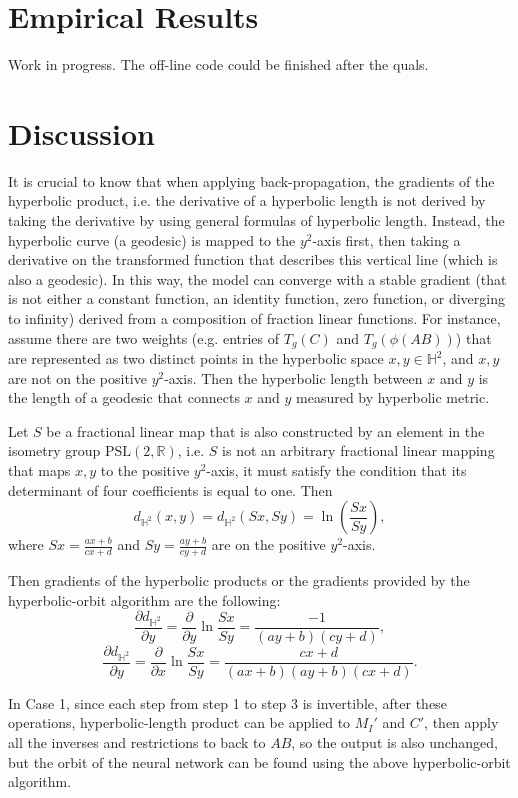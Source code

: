 \documentclass{article}
\theoremstyle{plain}
\theoremstyle{plain} %
\theoremstyle{definition}  %
\theoremstyle{remark}  %
\theoremstyle{plain}
\begin{document}
\section{Empirical Results}
Work in progress. The off-line code could be finished after the quals.

\section{Discussion}


It is crucial to know that when applying back-propagation, the gradients of the hyperbolic product, i.e. the derivative of a hyperbolic length is not derived by taking the derivative by using general formulas of hyperbolic length. Instead, the hyperbolic curve (a geodesic) is mapped to the $y^2$-axis first, then taking a derivative on the transformed function that describes this vertical line (which is also a geodesic). In this way, the model can converge with a stable gradient (that is not either a constant function, an identity function, zero function, or diverging to infinity) derived from a composition of fraction linear functions.
For instance, assume there are two weights (e.g. entries of $T_g(C)$ and $T_g(\phi (AB))$) that are represented as two distinct points in the hyperbolic space $x, y\in\mathbb{H}^2$, and $x, y$ are not on the positive $y^2$-axis.
Then the hyperbolic length between $x$ and $y$ is the length of a geodesic that connects $x$ and $y$ measured by hyperbolic metric.

Let $S$ be a fractional linear map that is also constructed by an element in the isometry group $\text{PSL}(2,\mathbb{R})$, i.e. $S$ is not an arbitrary fractional linear mapping that maps $x,y$ to the positive $y^2$-axis, it must satisfy the condition that its determinant of four coefficients is equal to one. Then
$$
d_{\mathbb{H}^2}(x,y)=d_{\mathbb{H}^2}(Sx,Sy)=\ln \left( \frac{ Sx}{Sy}\right),
$$
where $Sx=\frac{ax+b}{cx+d}$ and $Sy=\frac{ay+b}{cy+d}$ are on the positive $y^2$-axis.

Then gradients of the hyperbolic products or the gradients provided by the hyperbolic-orbit algorithm are the following:
$$
\frac{\partial d_{\mathbb{H}^2}}{\partial y}=\frac{\partial }{\partial y}\ln \frac{Sx}{Sy}=\frac{-1}{(ay+b)(cy+d)},
$$
$$
\frac{\partial d_{\mathbb{H}^2}}{\partial y}=\frac{\partial }{\partial x}\ln \frac{Sx}{Sy}=\frac{cx+d}{(ax+b)(ay+b)(cx+d)}.
$$

In Case 1, since each step from step 1 to step 3 is invertible, after these operations, hyperbolic-length product can be applied to $M_I'$ and $C'$, then apply all the inverses and restrictions to back to $AB$, so the output is also unchanged, but the orbit of the neural network can be found using the above hyperbolic-orbit algorithm.
\end{document}
